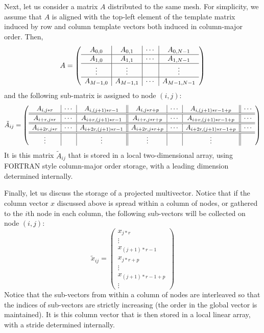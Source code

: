 Next, let us consider a matrix $ A $ distributed to the same mesh.
For simplicity, we assume that $ A $ is aligned with the top-left
element of the template matrix induced by row and column template vectors
both induced in column-major order.
Then,
\[
A = \left( \begin{array}{c | c | c | c }
A_{0,0} & A_{0,1} & \cdots & A_{0,N-1} \\ \hline
A_{1,0} & A_{1,1} & \cdots & A_{1,N-1} \\ \hline
\vdots & \vdots &        & \vdots \\ \hline
A_{M-1,0} & A_{M-1,1} & \cdots & A_{M-1,N-1}
\end{array}
\right)
\]
and the following sub-matrix is assigned to node $ (i,j) $:
\[
\tilde{A}_{ij} = \left( \begin{array}{c | c | c || c | c | c || c }
A_{i,j * r} & \cdots & A_{i,(j+1)*r-1} &
A_{i,j * r+p} & \cdots & A_{i,(j+1)*r-1+p} & \cdots
\\ \hline \hline
A_{i+r,j * r} & \cdots & A_{i+r,(j+1)*r-1} &
A_{i+r,j * r+p} & \cdots & A_{i+r,(j+1)*r-1+p} & \cdots
\\ \hline \hline
A_{i+2r,j * r} & \cdots & A_{i+2r,(j+1)*r-1} &
A_{i+2r,j * r+p} & \cdots & A_{i+2r,(j+1)*r-1+p} & \cdots
\\ \hline \hline
\vdots &  & \vdots & \vdots &  & \vdots &
\end{array} \right)
\]
It is this matrix $ \tilde{A}_{ij} $ that is stored in a local
two-dimensional array, using FORTRAN style column-major
order storage, with a leading dimension determined internally.

Finally, let us discuss the storage of a projected
multivector.  Notice that if the column vector $ x $ discussed above
is spread within a column of nodes, or gathered
to the $ i $th node in each column,
the following sub-vectors will be collected on
node $ (i,j) $:
\[
\tilde{x}_{ij} = \left( \begin{array}{c}
x_{j * r} \\ \hline
\vdots \\ \hline
x_{(j+1)*r-1} \\ \hline \hline
x_{j * r+p} \\ \hline
\vdots \\ \hline
x_{(j+1)*r-1+p} \\ \hline \hline
\vdots
\end{array} \right)
\]
Notice that the sub-vectors from within a column of nodes
are interleaved so that the indices of sub-vectors are
strictly increasing (the order in the global vector is maintained).
It is this column vector that is then stored in a local linear array,
with a stride determined internally.